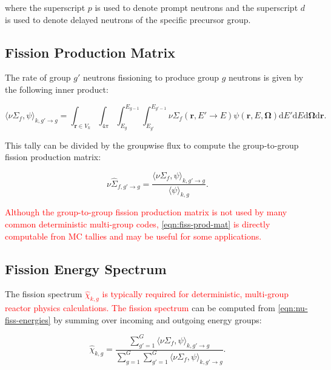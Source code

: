 \noindent where the superscript $p$ is used to denote prompt neutrons and the superscript $d$ is used to denote delayed neutrons of the specific precursor group.


\subsection{Fission Production Matrix}
\label{subsubsec:tally-types-fiss-matrix}

The rate of group $g'$ neutrons fissioning to produce group $g$ neutrons is given by the following inner product:

\begin{equation}
\label{eqn:nu-fiss-energies}
\langle \nu\Sigma_{f}, \psi \rangle_{k,g'\rightarrow g} = \int_{\mathbf{r} \in V_{k}} \int_{4\pi} \int_{E_{g}}^{E_{g-1}} \int_{E_{g'}}^{E_{g'-1}} \nu\Sigma_{f}(\mathbf{r},E'\rightarrow E)\psi(\mathbf{r},E,\mathbf{\Omega}) \mathrm{d}E'\mathrm{d}E\mathrm{d}\mathbf{\Omega}\mathrm{d}\mathbf{r}.
\end{equation}

\noindent This tally can be divided by the groupwise flux to compute the group-to-group fission production matrix:

\begin{equation}
\label{eqn:fiss-prod-mat}
\nu\hat{\Sigma}_{f,g'\rightarrow g} = \frac{\langle \nu\Sigma_{f}, \psi \rangle_{k,g'\rightarrow g}}{\langle \psi \rangle_{k,g}}.
\end{equation}

\textcolor{red}{Although the group-to-group fission production matrix is not used by many common deterministic multi-group codes, \cref{eqn:fiss-prod-mat} is directly computable fron MC tallies and may be useful for some applications.}


\subsection{Fission Energy Spectrum}
\label{subsubsec:tally-types-chi}

The fission spectrum \textcolor{red}{$\hat{\chi}_{k,g}$ is typically required for deterministic, multi-group reactor physics calculations. The fission spectrum} can be computed from \cref{eqn:nu-fiss-energies} by summing over incoming and outgoing energy groups:

\begin{equation}
\label{eqn:chi}
\hat{\chi}_{k,g} = \frac{\displaystyle\sum\limits_{g'=1}^{G} \langle \nu\Sigma_{f}, \psi \rangle_{k,g'\rightarrow g}}{\displaystyle\sum\limits_{g=1}^{G} \displaystyle\sum\limits_{g'=1}^{G} \langle \nu\Sigma_{f}, \psi \rangle_{k,g'\rightarrow g}}.
\end{equation}

